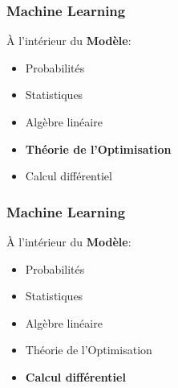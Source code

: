 \documentclass{formation}
\begin{document}
\begin{frame}
  \frametitle{Machine Learning}
  \begin{minipage}[c]{0.45\linewidth}
    À l'intérieur du \textbf{Modèle}:
    \begin{itemize}
    \item Probabilités
    \item Statistiques
    \item Algèbre linéaire
    \item \textbf{Théorie de l'Optimisation}
    \item Calcul différentiel
    \end{itemize}
  \end{minipage}\hfill
  \begin{minipage}[c]{0.55\linewidth}
  \end{minipage}\hfill
\end{frame}

\begin{frame}
  \frametitle{Machine Learning}
  \begin{minipage}[c]{0.41\linewidth}
    À l'intérieur du \textbf{Modèle}:
    \begin{itemize}
    \item Probabilités
    \item Statistiques
    \item Algèbre linéaire
    \item Théorie de l'Optimisation
    \item \textbf{Calcul différentiel}
    \end{itemize}
  \end{minipage}\hfill
  \begin{minipage}[c]{0.58\linewidth}
  \end{minipage}\hfill
\end{frame}
\end{document}
